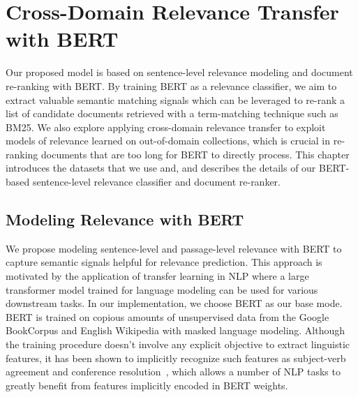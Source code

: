 \chapter{Cross-Domain Relevance Transfer with BERT}
\label{ch:model}


Our proposed model is based on sentence-level relevance modeling and document re-ranking with BERT.
By training BERT as a relevance classifier, we aim to extract valuable semantic matching signals which can be leveraged to re-rank a list of candidate documents retrieved with a term-matching technique such as BM25.
We also explore applying cross-domain relevance transfer to exploit models of relevance learned on out-of-domain collections, which is crucial in re-ranking documents that are too long for BERT to directly process.
This chapter introduces the datasets that we use and, and describes the details of our BERT-based sentence-level relevance classifier and document re-ranker.

\section{Modeling Relevance with BERT}

We propose modeling sentence-level and passage-level relevance with BERT to capture semantic signals helpful for relevance prediction.
This approach is motivated by the application of transfer learning in NLP where a large transformer model trained for language modeling can be used for various downstream tasks.
In our implementation, we choose BERT as our base mode.
BERT is trained on copious amounts of unsupervised data from the Google BookCorpus and English Wikipedia with masked language modeling.
Although the training procedure doesn't involve any explicit objective to extract linguistic features, it has been shown to implicitly recognize such features as subject-verb agreement and conference resolution~\cite{jawahar2019does, clark2019does}, which allows a number of NLP tasks to greatly benefit from features implicitly encoded in BERT weights.

